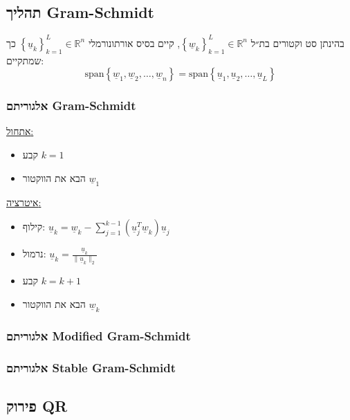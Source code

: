 \documentclass[11pt]{article}
\begin{document}
\subsection{תהליך Gram-Schmidt}
\label{sec:orgc3f9ae5}
בהינתן סט וקטורים בת״ל \(\left\{ \underline{w}_k \right\}_{k=1}^L \in \mathbb{R}^n\), קיים בסיס אורתונורמלי \(\left\{ \underline{u}_k \right\}_{k=1}^L \in \mathbb{R}^n\) כך שמתקיים:
\[
\text{span} \left\{ \underline{w}_1, \underline{w}_2, \ldots, \underline{w}_n \right\}
=
\text{span} \left\{ \underline{u}_1, \underline{u}_2, \ldots, \underline{u}_{L} \right\}
\]

\subsubsection{אלגוריתם Gram-Schmidt}
\label{sec:org179f474}
\uline{אתחול:}
\begin{itemize}
\item קבע \(k=1\)

\item הבא את הווקטור \(\underline{w}_1\)
\end{itemize}

\uline{איטרציה:}
\begin{itemize}
\item קילוף: \(\underline{u}_k = \underline{w}_k - \sum_{j=1}^{k-1} \left( \underline{u}_j^T\underline{w}_k \right) \underline{u}_j\)

\item נרמול: \(\underline{u}_k = \frac{\underline{u}_k}{\|\underline{u}_k\|_2}\)

\item קבע \(k=k+1\)

\item הבא את הווקטור \(\underline{w}_k\)
\end{itemize}

\subsubsection{אלגוריתם Modified Gram-Schmidt}
\label{sec:orgb95db2c}
\subsubsection{אלגוריתם Stable Gram-Schmidt}
\label{sec:org5a4cc0d}

\subsection{פירוק QR}
\label{sec:orgf29697f}
\end{document}
